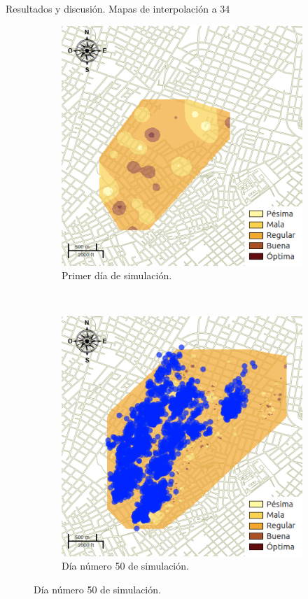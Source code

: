 \begin{frame}[t]{Resultados y discusión. Mapas de interpolación a 34 \textcelsius}
    \begin{figure}
    \begin{subfigure}[b]{0.45\textwidth}
        \includegraphics[width=\textwidth]{./graphics/temp-34-0.png}
        \caption{ Primer día de simulación.}
    \end{subfigure}
    ~~~~
    \begin{subfigure}[b]{0.45\textwidth}
        \includegraphics[width=\textwidth]{./graphics/temp-34-final.png}
        \caption{Día número 50 de simulación.}
    \end{subfigure}
    \end{figure}
\end{frame}
